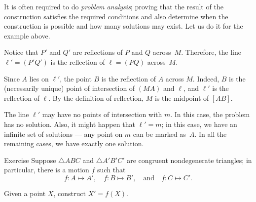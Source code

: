 It is often required to do \emph{problem analysis};
proving that the result of the construction satisfies the required conditions and also determine when the construction is possible and how many solutions may exist.
Let us do it for the example above.


Notice that $P'$ and $Q'$ are reflections of $P$ and $Q$ across~$M$.
Therefore, the line $\ell'=(P'Q')$ is the reflection of $\ell=(PQ)$ across~$M$.

Since $A$ lies on $\ell'$,
the point $B$ is the reflection of $A$ across $M$.
Indeed, $B$ is the (necessarily unique) point of intersection of $(MA)$ and $\ell$, and $\ell'$ is the reflection of $\ell$.
By the definition of reflection, $M$ is the midpoint of $[AB]$.

The line $\ell'$ may have no points of intersection with $m$.
In this case, the problem has no solution.
Also, it might happen that $\ell'=m$;
in this case, we have an infinite set of solutions --- any point on $m$ can be marked as~$A$.
In all the remaining cases, we have exactly one solution.
\qeds

\begin{thm}{Exercise}\label{ex:motion}
Suppose $\triangle ABC$ and $\triangle A'B'C'$ are congruent nondegenerate triangles;
in particular, there is a motion $f$ such that
\[f\colon A\mapsto A',\quad f\colon B\mapsto B',\quad\text{and}\quad f\colon C\mapsto C'.\]

Given a point $X$, construct $X'=f(X)$.
\end{thm}


